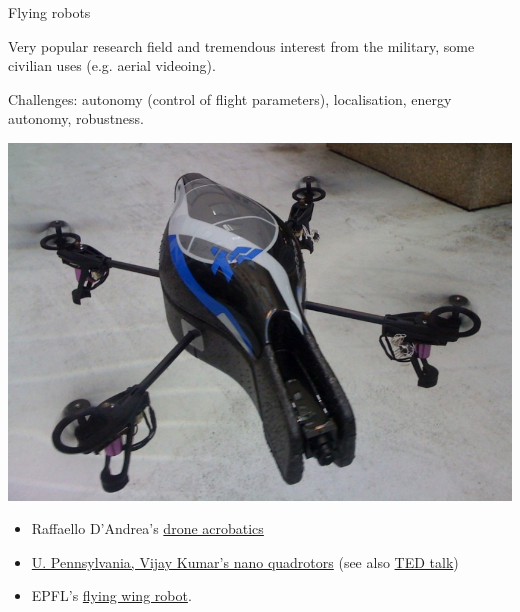 \documentclass[compress]{beamer}
\begin{document}
\begin{frame}{Flying robots}

    \begin{multicols}{2}

Very popular research field and tremendous interest from the military,
some civilian uses (e.g. aerial videoing).

Challenges: autonomy (control of flight parameters), localisation,
energy autonomy, robustness.

    \begin{center}
        \includegraphics[width=0.8\linewidth]{drone}
    \end{center}

    \end{multicols}
\begin{itemize}
    \item Raffaello D'Andrea's \href{https://www.youtube.com/watch?v=w2itwFJCgFQ}{drone acrobatics}
\item
  \href{http://youtu.be/YQIMGV5vtd4}{U. Pennsylvania, Vijay Kumar's nano
        quadrotors} (see also \href{http://youtu.be/4ErEBkj_3PY}{TED talk})
\item
  EPFL's \href{http://youtu.be/n_qRuHkD5lc}{flying wing robot}.
\end{itemize}

\end{frame}
\end{document}
